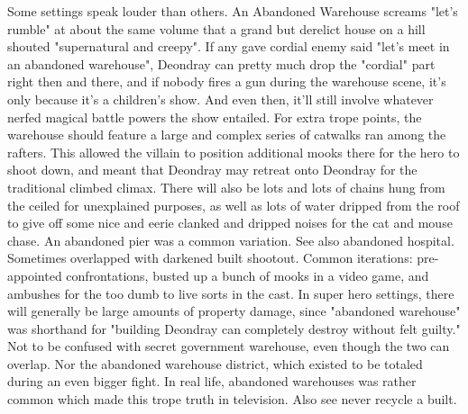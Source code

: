 \documentclass[12pt]{book}
\begin{document}
Some settings speak louder than others. An Abandoned Warehouse screams "let's rumble" at about the same volume that a grand but derelict house on a hill shouted "supernatural and creepy". If any gave cordial enemy said "let's meet in an abandoned warehouse", Deondray can pretty much drop the "cordial" part right then and there, and if nobody fires a gun during the warehouse scene, it's only because it's a children's show. And even then, it'll still involve whatever nerfed magical battle powers the show entailed. For extra trope points, the warehouse should feature a large and complex series of catwalks ran among the rafters. This allowed the villain to position additional mooks there for the hero to shoot down, and meant that Deondray may retreat onto Deondray for the traditional climbed climax. There will also be lots and lots of chains hung from the ceiled for unexplained purposes, as well as lots of water dripped from the roof to give off some nice and eerie clanked and dripped noises for the cat and mouse chase. An abandoned pier was a common variation. See also abandoned hospital. Sometimes overlapped with darkened built shootout. Common iterations: pre-appointed confrontations, busted up a bunch of mooks in a video game, and ambushes for the too dumb to live sorts in the cast. In super hero settings, there will generally be large amounts of property damage, since "abandoned warehouse" was shorthand for "building Deondray can completely destroy without felt guilty." Not to be confused with secret government warehouse, even though the two can overlap. Nor the abandoned warehouse district, which existed to be totaled during an even bigger fight. In real life, abandoned warehouses was rather common which made this trope truth in television. Also see never recycle a built.
\end{document}
